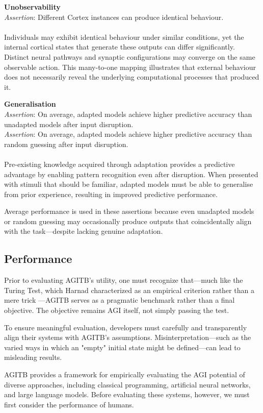 \documentclass{article}
\newcommand{\agitbtest}[2]{
  \item
  \begin{minipage}[t]{\linewidth}
    \textbf{#1} \\[0.5ex]
    #2
  \end{minipage}
}
\begin{document}
\begin{agitblist}
{}
\agitbtest{Unobservability}{
\emph{Assertion}: Different Cortex instances can produce identical behaviour.\\
\\
Individuals may exhibit identical behaviour under similar conditions, yet the internal cortical states that generate these outputs can differ significantly. Distinct neural pathways and synaptic configurations may converge on the same observable action. This many-to-one mapping illustrates that external behaviour does not necessarily reveal the underlying computational processes that produced it.
}
\agitbtest{Generalisation}{
\emph{Assertion}: On average, adapted models achieve higher predictive accuracy than unadapted models after input disruption.\\
\emph{Assertion}: On average, adapted models achieve higher predictive accuracy than random guessing after input disruption.\\
\\
Pre-existing knowledge acquired through adaptation provides a predictive advantage by enabling pattern recognition even after disruption. When presented with stimuli that should be familiar, adapted models must be able to generalise from prior experience, resulting in improved predictive performance.

Average performance is used in these assertions because even unadapted models or random guessing may occasionally produce outputs that coincidentally align with the task—despite lacking genuine adaptation.
}

\end{agitblist}

\subsection{Performance}

Prior to evaluating AGITB’s utility, one must recognize that—much like the Turing Test, which Harnad characterized as an empirical criterion rather than a mere trick \cite{Harnad1992}—AGITB serves as a pragmatic benchmark rather than a final objective. The objective remains AGI itself, not simply passing the test.

To ensure meaningful evaluation, developers must carefully and transparently align their systems with AGITB's assumptions. Misinterpretation—such as the varied ways in which an "empty" initial state might be defined—can lead to misleading results.

AGITB provides a framework for empirically evaluating the AGI potential of diverse approaches, including classical programming, artificial neural networks, and large language models. Before evaluating these systems, however, we must first consider the performance of humans.
\end{document}
